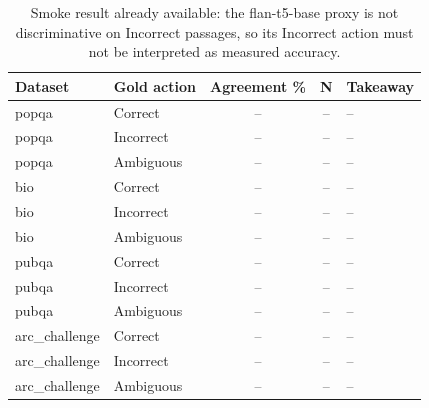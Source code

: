 
\begin{table}[h]
\centering
\caption{CRAG proxy vs.\ vendored reference labels (placeholder).}
\label{tab:crag_validity}
\begin{tabular}{llccp{3.2cm}}
\toprule
\textbf{Dataset} & \textbf{Gold action} & \textbf{Agreement \%} & \textbf{N} & \textbf{Takeaway} \\
\midrule
popqa & Correct & -- & -- & -- \\
popqa & Incorrect & -- & -- & -- \\
popqa & Ambiguous & -- & -- & -- \\
bio & Correct & -- & -- & -- \\
bio & Incorrect & -- & -- & -- \\
bio & Ambiguous & -- & -- & -- \\
pubqa & Correct & -- & -- & -- \\
pubqa & Incorrect & -- & -- & -- \\
pubqa & Ambiguous & -- & -- & -- \\
arc\_challenge & Correct & -- & -- & -- \\
arc\_challenge & Incorrect & -- & -- & -- \\
arc\_challenge & Ambiguous & -- & -- & -- \\
\bottomrule
\end{tabular}

\caption*{Smoke result already available: the flan-t5-base proxy is not
discriminative on Incorrect passages, so its Incorrect action must not be
interpreted as measured accuracy.}
\end{table}
